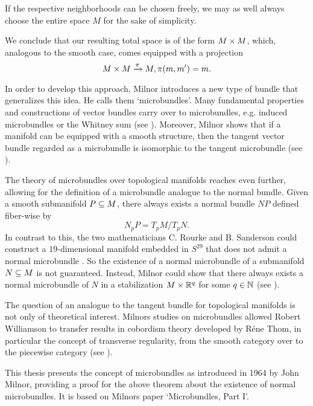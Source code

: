 \begin{myparagraph}
If the respective neighborhoods can be chosen freely, we may as well always choose the entire space $M$ for the sake of simplicity.

We conclude that our resulting total space is of the form $M \times M$, which, analogous to the smooth case, comes equipped with a projection \[ M \times M \xrightarrow{\pi} M, \pi(m, m') = m. \]

In order to develop this approach, Milnor introduces a new type of bundle that generalizes this idea. He calls them `microbundles'. Many fundamental properties and constructions of vector bundles carry over to microbundles, e.g. induced microbundles or the Whitney sum (see ). Moreover, Milnor shows that if a manifold can be equipped with a smooth structure, then the tangent vector bundle regarded as a microbundle is isomorphic to the tangent microbundle (see ).

The theory of microbundles over topological manifolds reaches even further, allowing for the definition of a microbundle analogue to the normal bundle. Given a smooth submanifold $P \subseteq{} M$, there always exists a normal bundle $NP$ defined fiber-wise by \[ N_p P = T_p M / T_p N. \] In contrast to this, the two mathematicians C. Rourke and B. Sanderson could construct a $19$-dimensional manifold embedded in $S^{29}$ that does not admit a normal microbundle \cite{rourke}. So the existence of a normal microbundle of a submanifold $N \subseteq{} M$ is not guaranteed. Instead, Milnor could show that there always exists a normal microbundle of $N$ in a stabilization $M \times \mathbb{R}^q$ for some $q \in \mathbb{N}$ (see ).

The question of an analogue to the tangent bundle for topological manifolds is not only of theoretical interest. Milnors studies on microbundles allowed Robert Williamson to transfer results in cobordism theory developed by Réne Thom, in particular the concept of transverse regularity, from the smooth category over to the piecewise category (see \cite[§3]{williamson}).

This thesis presents the concept of microbundles as introduced in 1964 by John Milnor, providing a proof for the above theorem about the existence of normal microbundles. It is based on Milnors paper `Microbundles, Part I'. \end{myparagraph}